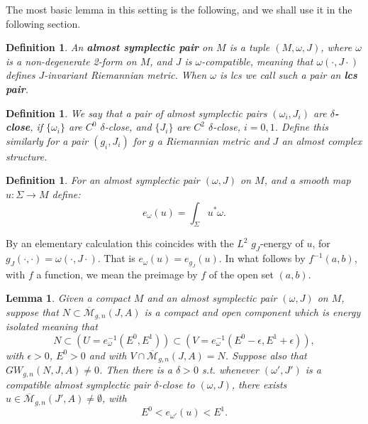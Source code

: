 \documentclass{amsart}
\numberwithin{equation}{section}
\newtheorem{lemma}[equation]{Lemma}
\newtheorem{definition}[equation]{Definition}
\theoremstyle{definition}
\theoremstyle{remark}
\begin{document}
The most basic lemma in this setting is the following, and we shall use it in the following section.
\begin{definition} An \textbf{\emph{almost symplectic pair}} on $M$ is a tuple $(M, \omega, J)$, where $\omega$ is a non-degenerate 2-form on $M$, and $J$ is $\omega$-compatible, meaning that $\omega (\cdot, J \cdot)$ defines $J$-invariant Riemannian metric. When $\omega$ is lcs we call such a pair an \textbf{\emph{lcs pair}}.
\end {definition}
\begin{definition} We say that a pair of almost symplectic pairs $(\omega _{i}, J _{i}  )$ are \textbf{$\delta$-close}, if $\{\omega _{i}\}$ are $C ^{0} $ $\delta$-close, and $\{J _{i} \}$ are $C ^{2} $ $\delta$-close, $i=0,1$. Define this similarly for a pair $(g _{i} ,J _{i} )$ for $g$ a Riemannian metric and $J$ an almost complex structure.
\end{definition}
\begin{definition} For an almost symplectic pair $(\omega,J)$ on $M$, and a smooth map $u: \Sigma \to M$ define:
\begin{equation*}
e_{\omega} (u) = \int _{\Sigma} u ^{*}\omega.
\end{equation*}
\end{definition}
By an elementary calculation this coincides with the $L ^{2} $ $g _{J} $-energy of $u$, for $g _{J} (\cdot, \cdot)= \omega (\cdot, J \cdot) $. That is $e _{\omega} (u)= e _{g _{J} } (u)   $.
In what follows by $f ^{-1} (a,b) $, with $f$ a function,  we mean the preimage by $f$ of the open set $(a,b)$.
\begin{lemma} \label{thm:nearbyGW} 
Given a compact $M$ and an almost symplectic pair $(\omega, J)$ on $M$, suppose that $N \subset \overline{\mathcal{M}} _{g,n}  (J,A)
$ is a compact and open component 
which is energy isolated meaning  that $$N \subset \left( U  =
e _{\omega}  ^{-1} (E ^{0}, E ^{1}) \right)
\subset \left( V  =
e _{\omega}  ^{-1} (E ^{0}  - \epsilon, E ^{1}  + \epsilon  ) \right),
$$ with $\epsilon>0$, $E ^{0} >0$ and with $V  \cap  \overline{\mathcal{M}} _{g,n}  (J,A)
= N$. Suppose also that $GW _{g,n} (N, J,A) \neq 0$.
   Then there is a $\delta>0$ s.t. whenever $(\omega', J')$ is a compatible almost symplectic pair 
   $\delta$-close to $(\omega, J)$, there exists $u \in \overline {\mathcal{M}} _{g,n} (J',A) \neq \emptyset $, with $$E ^{0}  < e _{\omega'} (u) < E ^{1}.
   $$
\end{lemma}
\end{document}
